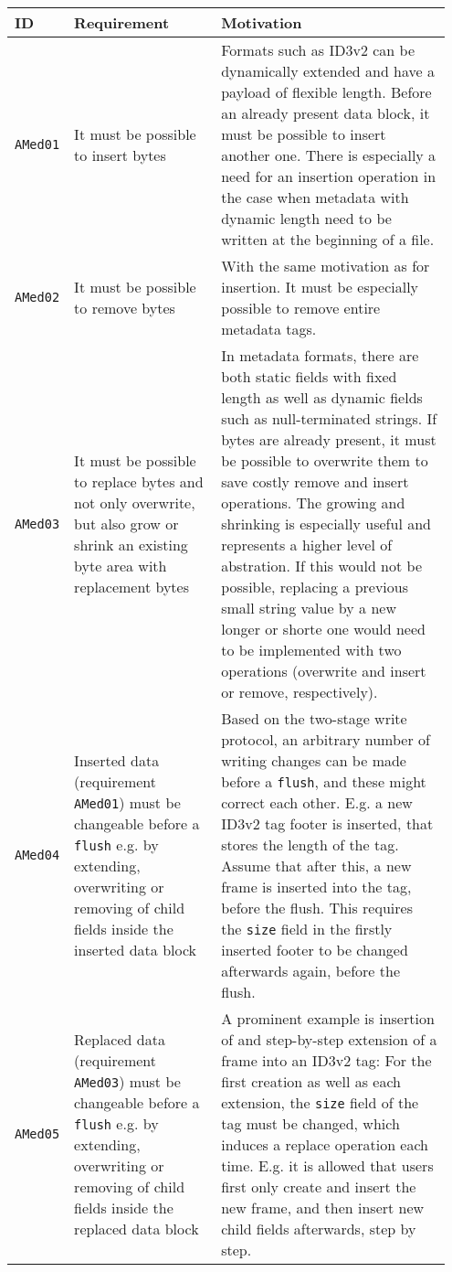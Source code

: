 \begin{landscape}
\begin{longtable}{|p{0.07\linewidth}|p{0.34\linewidth}|p{0.54\linewidth}|}
\hline
\rowcolor[gray]{.9}\textbf{ID} & \textbf{Requirement} & \textbf{Motivation} \\
\endhead
\hline
\texttt{AMed01} & It must be possible to insert bytes & Formats such as ID3v2 can be dynamically extended and have a payload of flexible length. Before an already present data block, it must be possible to insert another one. There is especially a need for an insertion operation in the case when metadata with dynamic length need to be written at the beginning of a file. \\
\hline
\texttt{AMed02} & It must be possible to remove bytes & With the same motivation as for insertion. It must be especially possible to remove entire metadata tags. \\
\hline
\texttt{AMed03} & It must be possible to replace bytes and not only overwrite, but also grow or shrink an existing byte area with replacement bytes & In metadata formats, there are both static fields with fixed length as well as dynamic fields such as null-terminated strings. If bytes are already present, it must be possible to overwrite them to save costly remove and insert operations. The growing and shrinking is especially useful and represents a higher level of abstration. If this would not be possible, replacing a previous small string value by a new longer or shorte one would need to be implemented with two operations (overwrite and insert or remove, respectively). \\
\hline
\texttt{AMed04} & Inserted data (requirement \texttt{AMed01}) must be changeable before a \texttt{flush} e.g. by extending, overwriting or removing of child fields inside the inserted data block & Based on the two-stage write protocol, an arbitrary number of writing changes can be made before a \texttt{flush}, and these might correct each other. E.g. a new ID3v2 tag footer is inserted, that stores the length of the tag. Assume that after this, a new frame is inserted into the tag, before the flush. This requires the \texttt{size} field in the firstly inserted footer to be changed afterwards again, before the flush. \\
\hline
\texttt{AMed05} & Replaced data (requirement \texttt{AMed03}) must be changeable before a \texttt{flush} e.g. by extending, overwriting or removing of child fields inside the replaced data block & A prominent example is insertion of and step-by-step extension of a frame into an ID3v2 tag: For the first creation as well as each extension, the \texttt{size} field of the tag must be changed, which induces a replace operation each time. E.g. it is allowed that users first only create and insert the new frame, and then insert new child fields afterwards, step by step. \\

\end{longtable}
\end{landscape}
